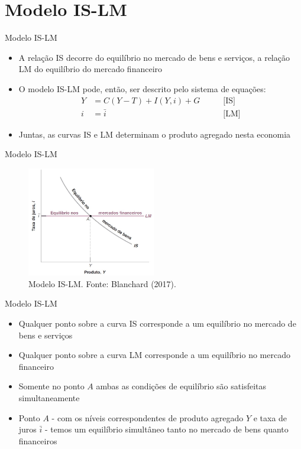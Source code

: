 \documentclass[10pt]{beamer}
\begin{document}
\section{Modelo IS-LM}
\begin{frame}{Modelo IS-LM}
    \begin{itemize}
        \item A relação IS decorre do equilíbrio no mercado de bens e serviços, a relação LM do equilíbrio do mercado financeiro
        \bigskip
        \item O modelo IS-LM pode, então, ser descrito pelo sistema de equações:
        \begin{align}
            Y &= C(Y - T) + I(Y, i) + G &\qquad \text{[IS]} \nonumber \\
            i &= \bar{i} &\qquad \text{[LM]} \nonumber
        \end{align}
        \item Juntas, as curvas IS e LM determinam o produto agregado nesta economia
    \end{itemize}
\end{frame}

\begin{frame}{Modelo IS-LM}
    \begin{figure}
        \centering
        \includegraphics[width=0.5\textwidth]{./figures/aula082_fig4.JPG}
        \caption{Modelo IS-LM. Fonte: Blanchard (2017).}
        \label{fig:is-lm}
    \end{figure}
\end{frame}

\begin{frame}{Modelo IS-LM}
    \begin{itemize}
        \item Qualquer ponto sobre a curva IS corresponde a um equilíbrio no mercado de bens e serviços
        \bigskip
        \item Qualquer ponto sobre a curva LM corresponde a um equilíbrio no mercado financeiro
        \bigskip
        \item Somente no ponto $A$ ambas as condições de equilíbrio são satisfeitas simultaneamente
        \bigskip
        \item Ponto $A$ - com os níveis correspondentes de produto agregado $Y$ e taxa de juros $\bar{i}$ - temos um equilíbrio simultâneo tanto no mercado de bens quanto financeiros
    \end{itemize}
\end{frame}
\end{document}
